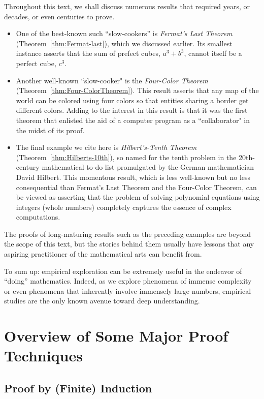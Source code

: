 \smallskip

Throughout this text, we shall discuss numerous results that required years, or decades, or even centuries to prove.
\begin{itemize}
\item
One of the best-known such ``slow-cookers'' is {\it Fermat's Last Theorem} (Theorem~\ref{thm:Fermat-last}), which we discussed earlier.  Its smallest instance asserts that the sum of prefect cubes, $a^3 + b^3$, cannot itself be a perfect cube, $c^3$.
\item
Another well-known ``slow-cooker" is the {\it Four-Color Theorem}
(Theorem~\ref{thm:Four-ColorTheorem}).  This result asserts that any map of the world can be colored using four colors so that entities sharing a border get different colors.  Adding to the interest in this result is that it was the first theorem that enlisted the aid of a computer program as a ``collaborator" in the midst of its proof.
\item
The final example we cite here is {\it Hilbert's-Tenth Theorem} (Theorem~\ref{thm:Hilberts-10th}), so named for the tenth problem in the 20th-century mathematical to-do list promulgated by the German mathematician David Hilbert.  This momentous result, which is less well-known but no less consequential than Fermat's Last Theorem and the Four-Color Theorem, can be viewed as asserting that the problem of solving polynomial equations using integers (whole numbers) completely captures the essence of complex computations.
  
\end{itemize}
The proofs of long-maturing results such as the preceding examples are beyond the scope of this text, but the stories behind them usually have lessons that any aspiring practitioner of the mathematical arts can benefit from.

\smallskip

To sum up: empirical exploration can be extremely useful in the endeavor of ``doing'' mathematics.  Indeed, as we explore phenomena of immense complexity or even phenomena that inherently involve immensely large numbers, empirical studies are the only known avenue toward deep understanding.


\section{Overview of Some Major Proof Techniques}
\label{sec:major-proof-techniques}

\subsection{Proof by (Finite) Induction}
\label{sec:Induction}

